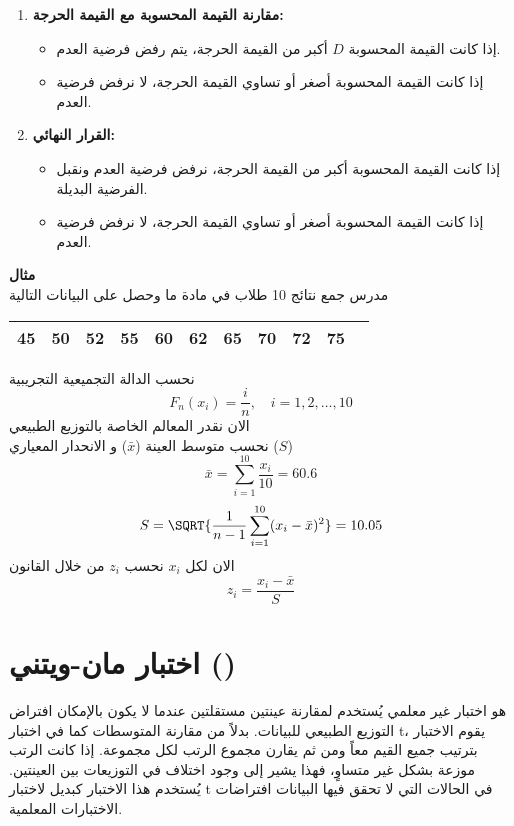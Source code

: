 \begin{enumerate}
	\item \textbf{مقارنة القيمة المحسوبة مع القيمة الحرجة:}
	\begin{itemize}
		\item إذا كانت القيمة المحسوبة \( D \) أكبر من القيمة الحرجة، يتم رفض فرضية العدم.
		\item إذا كانت القيمة المحسوبة أصغر أو تساوي القيمة الحرجة، لا نرفض فرضية العدم.
	\end{itemize}
	
	\item \textbf{القرار النهائي:}
	\begin{itemize}
		\item إذا كانت القيمة المحسوبة أكبر من القيمة الحرجة، نرفض فرضية العدم ونقبل الفرضية البديلة.
		\item إذا كانت القيمة المحسوبة أصغر أو تساوي القيمة الحرجة، لا نرفض فرضية العدم.
	\end{itemize}
\end{enumerate}

\noindent
\textbf{مثال}\\
مدرس جمع نتائج 10 طلاب في مادة ما وحصل على البيانات التالية

\begin{table}[H]
	\centering
	\begin{tabular}{|c|c|c|c|c|c|c|c|c|c|c|}
		\hline
		45&50&52&55 &60&62&65 &70&72&75\\
		\hline
	\end{tabular}
\end{table}
نحسب الدالة التجميعية التجريبية
\[
F_n(x_i) = \frac{i}{n} , \quad i = 1,2,\dots,10
\]
الان نقدر المعالم الخاصة بالتوزيع الطبيعي\\
نحسب متوسط العينة ($\bar{x}$) و الانحدار المعياري ($S$)
\[
\bar{x} = \sum_{i=1}^{10} \frac{x_i}{10} = 60.6 
\]
\[
S = \SQRT{\frac{1}{n-1} \sum_{i=1}^{10} (x_i - \bar{x})^2} = 10.05
\]
الان لكل $x_i$ نحسب $z_i$ من خلال القانون
\[
z_i = \frac{x_i - \bar{x}}{S}
\]
\section{اختبار مان-ويتني ()}
هو اختبار غير معلمي يُستخدم لمقارنة عينتين مستقلتين عندما لا يكون بالإمكان افتراض التوزيع الطبيعي للبيانات. بدلاً من مقارنة المتوسطات كما في اختبار t، يقوم الاختبار بترتيب جميع القيم معاً ومن ثم يقارن مجموع الرتب لكل مجموعة. إذا كانت الرتب موزعة بشكل غير متساوٍ، فهذا يشير إلى وجود اختلاف في التوزيعات بين العينتين. يُستخدم هذا الاختبار كبديل لاختبار t في الحالات التي لا تحقق فيها البيانات افتراضات الاختبارات المعلمية.

